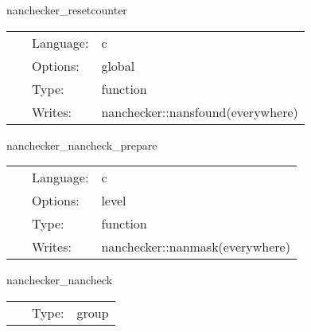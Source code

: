 \vspace{5mm}


\hspace{5mm} nanchecker\_resetcounter 

\hspace{5mm}{\it reset the nanchecker::nansfound counter } 


\hspace{5mm}

 \begin{tabular*}{160mm}{cll} 
~ & Language:  & c \\ 
~ & Options:  & global \\ 
~ & Type:  & function \\ 
~ & Writes:  & nanchecker::nansfound(everywhere) \\ 
\end{tabular*} 


\vspace{5mm}


\hspace{5mm} nanchecker\_nancheck\_prepare 

\hspace{5mm}{\it prepare data structures to check for nans } 


\hspace{5mm}

 \begin{tabular*}{160mm}{cll} 
~ & Language:  & c \\ 
~ & Options:  & level \\ 
~ & Type:  & function \\ 
~ & Writes:  & nanchecker::nanmask(everywhere) \\ 
\end{tabular*} 


\vspace{5mm}


\hspace{5mm} nanchecker\_nancheck 

\hspace{5mm}{\it check for nans and count them in nanchecker::nansfound } 


\hspace{5mm}

 \begin{tabular*}{160mm}{cll} 
~ & Type:  & group \\ 
\end{tabular*} 


